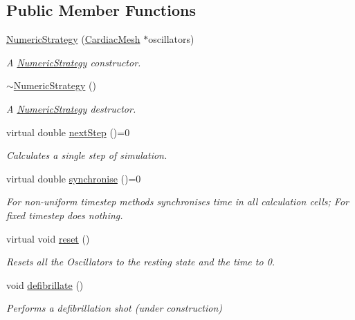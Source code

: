 \subsection*{Public Member Functions}
\begin{DoxyCompactItemize}
\item 
\hyperlink{class_numeric_strategy_a8f4a5e5be06427098e3a9b3635658786}{Numeric\+Strategy} (\hyperlink{class_cardiac_mesh}{Cardiac\+Mesh} $\ast$oscillators)
\begin{DoxyCompactList}\small\item\em A \hyperlink{class_numeric_strategy}{Numeric\+Strategy} constructor. \end{DoxyCompactList}\item 
\hyperlink{class_numeric_strategy_ac167251a4c6409131a1be21ce3104870}{$\sim$\+Numeric\+Strategy} ()
\begin{DoxyCompactList}\small\item\em A \hyperlink{class_numeric_strategy}{Numeric\+Strategy} destructor. \end{DoxyCompactList}\item 
virtual double \hyperlink{class_numeric_strategy_aeab387274e9d0ebf46a0e5ad5a5fe73f}{next\+Step} ()=0
\begin{DoxyCompactList}\small\item\em Calculates a single step of simulation. \end{DoxyCompactList}\item 
virtual double \hyperlink{class_numeric_strategy_a5dec2aaf22a9642fdd92b55c12353f82}{synchronise} ()=0
\begin{DoxyCompactList}\small\item\em For non-\/uniform timestep methods synchronises time in all calculation cells; For fixed timestep does nothing. \end{DoxyCompactList}\item 
virtual void \hyperlink{class_numeric_strategy_af85e11ad875a008cd1b6d8b288e3866c}{reset} ()
\begin{DoxyCompactList}\small\item\em Resets all the Oscillators to the resting state and the time to 0. \end{DoxyCompactList}\item 
void \hyperlink{class_numeric_strategy_a0c081c97ced262ef0478daf66041ee05}{defibrillate} ()
\begin{DoxyCompactList}\small\item\em Performs a defibrillation shot (under construction) \end{DoxyCompactList}\end{DoxyCompactItemize}
